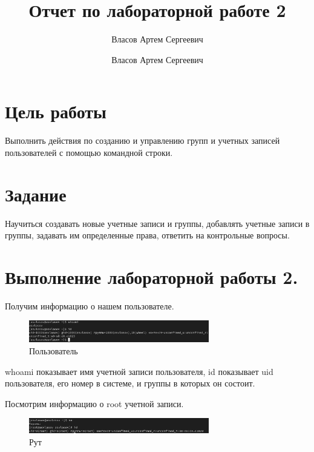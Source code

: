 \documentclass[
  12pt,
  a4paper,
  DIV=11,
  numbers=noendperiod]{scrreprt}
\title{Отчет по лабораторной работе 2}
\subtitle{Власов Артем Сергеевич}
\author{Власов Артем Сергеевич}
\date{}
\renewcommand*\contentsname{Содержание}
\newcommand\contentsname{Содержание}
\begin{document}
\maketitle

\renewcommand*\contentsname{Содержание}
{
\setcounter{tocdepth}{1}
\tableofcontents
}
\listoffigures
\listoftables
{}
\chapter{Цель
работы}\label{ux446ux435ux43bux44c-ux440ux430ux431ux43eux442ux44b}

Выполнить действия по созданию и управлению групп и учетных записей
пользователей с помощью командной строки.

\chapter{Задание}\label{ux437ux430ux434ux430ux43dux438ux435}

Научиться создавать новые учетные записи и группы, добавлять учетные
записи в группы, задавать им определенные права, ответить на контрольные
вопросы.

\chapter{Выполнение лабораторной работы
2.}\label{ux432ux44bux43fux43eux43bux43dux435ux43dux438ux435-ux43bux430ux431ux43eux440ux430ux442ux43eux440ux43dux43eux439-ux440ux430ux431ux43eux442ux44b-2.}

Получим информацию о нашем пользователе.

\begin{figure}

{\centering \includegraphics[width=0.7\textwidth,height=\textheight]{image/1.png}

}

\caption{Пользователь}

\end{figure}%

whoami показывает имя учетной записи пользователя, id показывает uid
пользователя, его номер в системе, и группы в которых он состоит.

Посмотрим информацию о root учетной записи.

\begin{figure}

{\centering \includegraphics[width=0.7\textwidth,height=\textheight]{image/2.png}

}

\caption{Рут}

\end{figure}%
\end{document}
